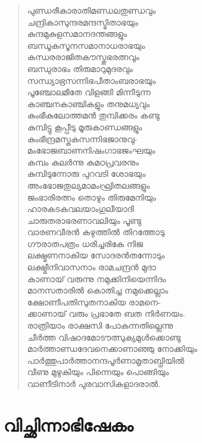 \begin{verse}
പുണ്ഡരീകാരാതിമണ്ഡലതുണ്ഡവും\\
ചന്ദ്രികാസുന്ദരമന്ദസ്മിതാഭയും\\
കുന്ദമുകുളസമാനദന്തങ്ങളും\\
ബന്ധൂകസൂനസമാനാധരാഭയും\\
കന്ധരരാജിതകൗസ്തുഭരത്നവും\\
ബന്ധുരാഭം തിരുമാറുമുദരവും\\
സന്ധ്യാഭ്രസന്നിഭപീതാംബരാഭയും\\
പൂഞ്ചോലമീതേ വിളങ്ങി മിന്നീടുന്ന\\
കാഞ്ചനകാഞ്ചികളും തനുമധ്യവും\\
കുംഭീകുലോത്തമന്‍ തുമ്പിക്കരം കണ്ടു\\
കുമ്പിട്ടു കൂപ്പീടു മൂരുകാണ്ഡങ്ങളും\\
കുംഭീന്ദ്രമസ്തകസന്നിഭജാനുവു-\\
മംഭോജബാണനിഷംഗാഭജംഘയും\\
കമ്പം കലര്‍ന്നു കമഠപ്രവരനും\\
കുമ്പിടുന്നോരു പുറവടി ശോഭയും\\
അംഭോജതുല്യമാമംഘ്രിതലങ്ങളും\\
ജംഭാരിരത്നം തൊഴും തിരുമേനിയും\\
ഹാരകടകവലയാംഗുലീയാദി\\
ചാരുതരാഭരണാവലിയും പൂണ്ടു\\
വാരണവീരന്‍ കഴുത്തില്‍ തിറത്തോടു\\
ഗൗരാതപത്രം ധരിച്ചരികേ നിജ\\
ലക്ഷ്മണനാകിയ സോദരന്‍തന്നോടും\\
ലക്ഷ്മീനിവാസനാം രാമചന്ദ്രന്‍ മുദാ\\
കാണായ് വരുന്നു നമുക്കിനിയെന്നിദം\\
മാനസതാരില്‍ കൊതിച്ച നമുക്കെല്ലാം\\
ക്ഷോണീപതിസുതനാകിയ രാമനെ-\\
ക്കാണായ് വരും പ്രഭാതേ ബത നിര്‍ണയം.\\
രാത്രിയാം രാക്ഷസി പോകുന്നതില്ലെന്നു\\
ചീര്‍ത്ത വിഷാദമോടൗത്സുക്യമുള്‍ക്കൊണ്ടു\\
മാര്‍ത്താണ്ഡദേവനെക്കാണാഞ്ഞു നോക്കിയും\\
പാര്‍ത്തുപാര്‍ത്താനന്ദപൂര്‍ണാമൃതാബ്ധിയില്‍\\
വീണു മുഴുകിയും പിന്നെയും പൊങ്ങിയും\\
വാണീടിനാര്‍ പുരവാസികളാദരാല്‍.
\end{verse}


\section{വിച്ഛിന്നാഭിഷേകം}

